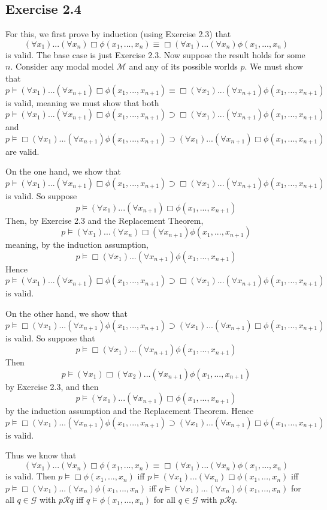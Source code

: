\documentclass{article}
\theoremstyle{definition}
\begin{document}
\subsection*{Exercise 2.4}
For this, we first prove by induction (using Exercise 2.3) that
\[ (\forall x_1)...(\forall x_n)\Box\phi(x_1,...,x_n)\equiv\Box(\forall x_1)...(\forall x_n)\phi(x_1,...,x_n) \] 
is valid.
The base case is just Exercise 2.3. Now suppose the result holds for some $n$. Consider any modal model $\mathcal{M}$ and any of its possible 
worlds $p$. We must show that 
\[ p\vDash (\forall x_1)...(\forall x_{n+1})\Box\phi(x_1,...,x_{n+1})\equiv\Box(\forall x_1)...(\forall x_{n+1})\phi(x_1,...,x_{n+1})\]
 is valid, meaning 
we must show that both
\[ p\vDash (\forall x_1)...(\forall x_{n+1})\Box\phi(x_1,...,x_{n+1})\supset\Box(\forall x_1)...(\forall x_{n+1})\phi(x_1,...,x_{n+1}) \]
and
\[ p\vDash \Box(\forall x_1)...(\forall x_{n+1})\phi(x_1,...,x_{n+1})\supset(\forall x_1)...(\forall x_{n+1})\Box\phi(x_1,...,x_{n+1}) \]
are valid.

On the one hand, we show that
\[ p\vDash (\forall x_1)...(\forall x_{n+1})\Box\phi(x_1,...,x_{n+1})\supset\Box(\forall x_1)...(\forall x_{n+1})\phi(x_1,...,x_{n+1}) \] 
is valid.
So suppose \[ p\vDash (\forall x_1)...(\forall x_{n+1})\Box\phi(x_1,...,x_{n+1}) \] Then, by Exercise 2.3 and the Replacement Theorem,
\[ p\vDash (\forall x_1)...(\forall x_n)\Box (\forall x_{n+1})\phi(x_1,...,x_{n+1}) \] meaning, by the induction assumption,
\[ p\vDash\Box (\forall x_1)...(\forall x_{n+1})\phi(x_1,...,x_{n+1}) \] Hence 
\[ p\vDash (\forall x_1)...(\forall x_{n+1})\Box\phi(x_1,...,x_{n+1})\supset\Box(\forall x_1)...(\forall x_{n+1})\phi(x_1,...,x_{n+1}) \] 
is valid.

On the other hand, we show that
\[ p\vDash \Box(\forall x_1)...(\forall x_{n+1})\phi(x_1,...,x_{n+1})\supset(\forall x_1)...(\forall x_{n+1})\Box\phi(x_1,...,x_{n+1}) \] 
is valid.
So suppose that \[ p\vDash\Box(\forall x_1)...(\forall x_{n+1})\phi(x_1,...,x_{n+1}) \] Then
\[ p\vDash (\forall x_1)\Box(\forall x_2)...(\forall x_{n+1})\phi(x_1,...,x_{n+1}) \] by Exercise 2.3,
and then
\[ p\vDash (\forall x_1)...(\forall x_{n+1})\Box\phi(x_1,...,x_{n+1}) \] by the induction assumption and the Replacement Theorem. Hence
\[ p\vDash \Box(\forall x_1)...(\forall x_{n+1})\phi(x_1,...,x_{n+1})\supset(\forall x_1)...(\forall x_{n+1})\Box\phi(x_1,...,x_{n+1}) \] is valid.

Thus we know that
\[ (\forall x_1)...(\forall x_n)\Box\phi(x_1,...,x_n)\equiv\Box(\forall x_1)...(\forall x_n)\phi(x_1,...,x_n) \] is valid.
Then $p\vDash\Box\phi(x_1,...,x_n)$ iff 
$p\vDash (\forall x_1)...(\forall x_n)\Box\phi(x_1,...,x_n)$ iff 
$p\vDash \Box(\forall x_1)...(\forall x_n)\phi(x_1,...,x_n)$ iff 
$q\vDash (\forall x_1)...(\forall x_n)\phi(x_1,...,x_n)$ for all $q\in\mathcal{G}$ with $p\mathcal{R}q$ iff 
$q\vDash \phi(x_1,...,x_n)$ for all $q\in\mathcal{G}$ with $p\mathcal{R}q$.
\end{document}

